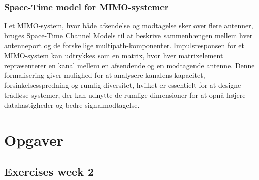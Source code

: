 \documentclass[a4paper,12pt]{book}
\begin{document}
	\subsection*{Space-Time model for MIMO-systemer}
	I et MIMO-system, hvor både afsendelse og modtagelse sker over flere antenner, bruges Space-Time Channel Models til at beskrive sammenhængen mellem hver antenneport og de forskellige multipath-komponenter. Impulsresponsen for et MIMO-system kan udtrykkes som en matrix, hvor hver matrixelement repræsenterer en kanal mellem en afsendende og en modtagende antenne.
	\newline\newline
	Denne formalisering giver mulighed for at analysere kanalens kapacitet, forsinkelsesspredning og rumlig diversitet, hvilket er essentielt for at designe trådløse systemer, der kan udnytte de rumlige dimensioner for at opnå højere datahastigheder og bedre signalmodtagelse.
	
	\chapter{Opgaver}
	\section{Exercises week 2}
	
\end{document}
